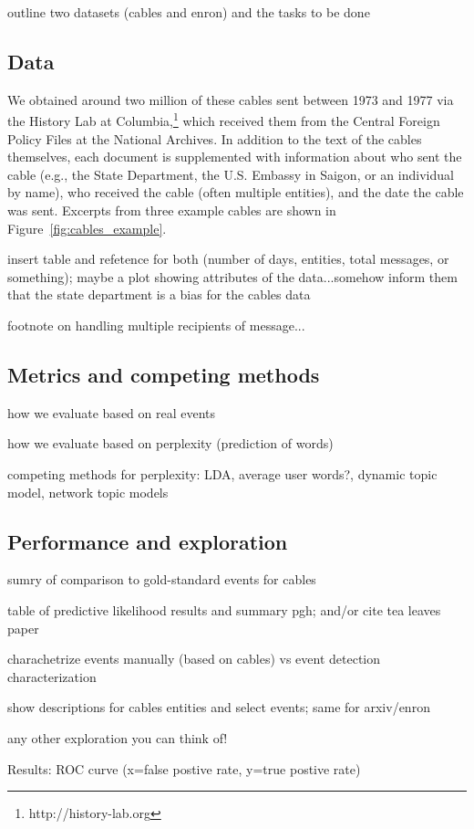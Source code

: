 \PP outline two datasets (cables and enron) and the tasks to be done

\subsection{Data}
We obtained around two million of these cables sent between 1973 and 1977 via the History Lab at Columbia,\footnote{http://history-lab.org} which received them from the Central Foreign Policy Files at the National Archives.  In addition to the text of the cables themselves, each document is supplemented with information about who sent the cable (e.g., the State Department, the U.S. Embassy in Saigon, or an individual by name), who received the cable (often multiple entities), and the date the cable was sent.
Excerpts from three example cables are shown in Figure~\ref{fig:cables_example}.





\PP insert table and refetence for both (number of days, entities, total messages, or something); maybe a plot showing attributes of the data...somehow inform them that the state department is a bias for the cables data

\PP footnote on handling multiple recipients of message...

\subsection{Metrics and competing methods}

\PP how we evaluate based on real events

\PP how we evaluate based on perplexity (prediction of words)

\PP competing methods for perplexity: LDA, average user words?, dynamic topic model, network topic models

\subsection{Performance and exploration}

\PP sumry of comparison to gold-standard events for cables

\PP table of predictive likelihood results and summary pgh; and/or cite tea leaves paper


\PP charachetrize events manually (based on cables) vs event detection characterization

\PP show descriptions for cables entities and select events; same for arxiv/enron

\PP any other exploration you can think of!


Results: ROC curve (x=false postive rate, y=true postive rate)